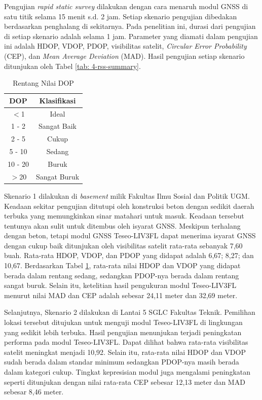 \documentclass[conference]{IEEEtran}
\begin{document}
Pengujian \textit{rapid static survey} dilakukan dengan cara menaruh modul GNSS di satu titik selama 15 menit s.d. 2 jam. Setiap skenario pengujian dibedakan berdasarkan penghalang di sekitarnya. Pada penelitian ini, durasi dari pengujian di setiap skenario adalah selama 1 jam. Parameter yang diamati dalam pengujian ini adalah HDOP, VDOP, PDOP, visibilitas satelit, \textit{Circular Error Probability} (CEP), dan \textit{Mean Average Deviation} (MAD). Hasil pengujian setiap skenario ditunjukan oleh Tabel \ref{tab: 4-rss-summary}.

\begin{table}[h]
	\caption{Rentang Nilai DOP}
	\centering
	\renewcommand{\arraystretch}{1.5}
	\begin{tabular}{cc}
		\hline
		\textbf{DOP} & \textbf{Klasifikasi}\\
		\hline 
		$<$1 & Ideal\\
		1 - 2 & Sangat Baik\\
		2 - 5 & Cukup \\ 
		5 - 10 & Sedang\\
		10 - 20 & Buruk\\ 
		$>$20 & Sangat Buruk\\
		\hline
	\end{tabular}
	\label{tab: 3-dop-class}
\end{table}

Skenario 1 dilakukan di \textit{basement} milik Fakultas Ilmu Sosial dan Politik UGM. Keadaan sekitar pengujian ditutupi oleh konstruksi beton dengan sedikit daerah terbuka yang memungkinkan sinar matahari untuk masuk. Keadaan tersebut tentunya akan sulit untuk ditembus oleh isyarat GNSS. Meskipun terhalang dengan beton, tetapi modul GNSS Teseo-LIV3FL dapat menerima isyarat GNSS dengan cukup baik ditunjukan oleh visibilitas satelit rata-rata sebanyak 7,60 buah. Rata-rata HDOP, VDOP, dan PDOP yang didapat adalah 6,67; 8,27; dan 10,67. Berdasarkan Tabel \ref{tab: 3-dop-class}, rata-rata nilai HDOP dan VDOP yang didapat berada dalam rentang sedang, sedangkan PDOP-nya berada dalam rentang sangat buruk. Selain itu, ketelitian hasil pengukuran modul Teseo-LIV3FL menurut nilai MAD dan CEP adalah sebesar 24,11 meter dan 32,69 meter.

Selanjutnya, Skenario 2 dilakukan di Lantai 5 SGLC Fakultas Teknik. Pemilihan lokasi tersebut ditujukan untuk menguji modul Teseo-LIV3FL di lingkungan yang sedikit lebih terbuka. Hasil pengujian menunjukan terjadi peningkatan performa pada modul Teseo-LIV3FL. Dapat dilihat bahwa rata-rata visibilitas satelit meningkat menjadi 10,92. Selain itu, rata-rata nilai HDOP dan VDOP sudah berada dalam standar minimum sedangkan PDOP-nya masih berada dalam kategori cukup. Tingkat kepresisian modul juga mengalami peningkatan seperti ditunjukan dengan nilai rata-rata CEP sebesar 12,13 meter dan MAD sebesar 8,46 meter.
\end{document}
